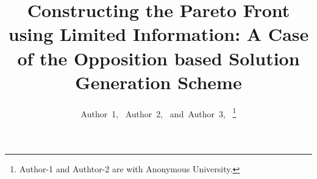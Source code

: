 \documentclass[journal]{IEEEtran}
\newcommand{\papertitle}{Constructing the Pareto Front using Limited Information: A Case of the Opposition based Solution Generation Scheme}
\begin{document}
%
\title{\papertitle}
%
%
%

\author{Author~1,~
         Author~2,~
         and~Author~3,~%
\thanks{Author-1 and Authtor-2 are with Anonymous University.}%
}

% 
%
\end{document}
